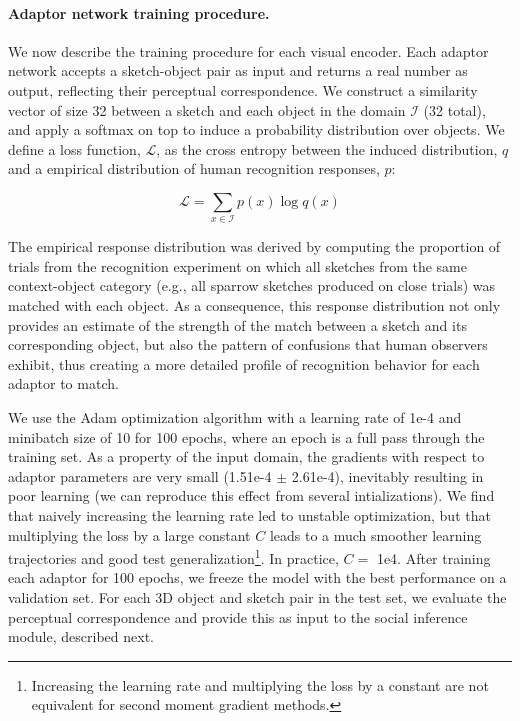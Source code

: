 \documentclass[9pt,twocolumn,twoside]{pnas-new}
\begin{document}
{\paragraph{Adaptor network training procedure.}
We now describe the training procedure for each visual encoder. Each adaptor network accepts a sketch-object pair as input and returns a real number as output, reflecting their perceptual correspondence. We construct a similarity vector of size 32 between a sketch and each object in the domain $\mathcal{I}$ (32 total), and apply a softmax on top to induce a probability distribution over objects. We define a loss function, $\mathcal{L}$, as the cross entropy between the induced distribution, $q$ and a empirical distribution of human recognition responses, $p$:

\begin{equation}
    \mathcal{L} = \sum_{x \in \mathcal{I}} p(x)\log q(x)
    \label{eqn:cross_entropy}
\end{equation}

The empirical response distribution was derived by computing the proportion of trials from the recognition experiment on which all sketches from the same context-object category (e.g., all sparrow sketches produced on close trials) was matched with each object. As a consequence, this response distribution not only provides an estimate of the strength of the match between a sketch and its corresponding object, but also the pattern of confusions that human observers exhibit, thus creating a more detailed profile of recognition behavior for each adaptor to match.

We use the Adam optimization algorithm \cite[]{kingma2014adam} with a learning rate of 1e-4 and minibatch size of 10 for 100 epochs, where an epoch is a full pass through the training set. As a property of the input domain, the gradients with respect to adaptor parameters are very small (1.51e-4 $\pm$ 2.61e-4), inevitably resulting in poor learning (we can reproduce this effect from several intializations). We find that naively increasing the learning rate led to unstable optimization, but that multiplying the loss by a large constant $C$ leads to a much smoother learning trajectories and good test generalization\footnote{Increasing the learning rate and multiplying the loss by a constant are not equivalent for second moment gradient methods.}. In practice, $C =$ 1e4. After training each adaptor for 100 epochs, we freeze the model with the best performance on a validation set. For each 3D object and sketch pair in the test set, we evaluate the perceptual correspondence and provide this as input to the social inference module, described next.

}
\end{document}
